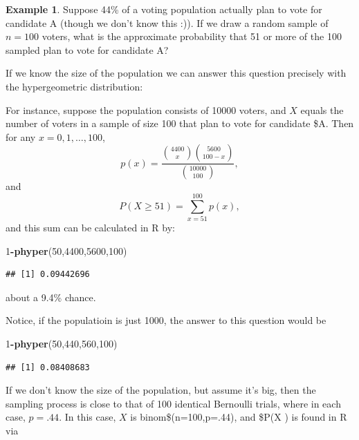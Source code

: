 \documentclass[
]{book}
\newenvironment{Shaded}{\begin{snugshade}}{\end{snugshade}}
\newcommand{\DecValTok}[1]{\textcolor[rgb]{0.00,0.00,0.81}{#1}}
\newcommand{\FunctionTok}[1]{\textcolor[rgb]{0.13,0.29,0.53}{\textbf{#1}}}
\newcommand{\NormalTok}[1]{#1}
\newcommand{\SpecialCharTok}[1]{\textcolor[rgb]{0.81,0.36,0.00}{\textbf{#1}}}
\theoremstyle{definition}
\theoremstyle{definition}
\newtheorem{example}{Example}[chapter]
\theoremstyle{definition}
\theoremstyle{definition}
\theoremstyle{remark}
\begin{document}
\begin{example}

Suppose 44\% of a voting population actually plan to vote for candidate A (though we don't know this :)). If we draw a random sample of \(n = 100\) voters, what is the approximate probability that 51 or more of the 100 sampled plan to vote for candidate A?

If we know the size of the population we can answer this question precisely with the hypergeometric distribution:

For instance, suppose the population consists of 10000 voters, and \(X\) equals the number of voters in a sample of size 100 that plan to vote for candidate \$A. Then for any \(x = 0, 1, \ldots, 100\),
\[p(x) = \frac{\binom{4400}{x}\binom{5600}{100-x}}{\binom{10000}{100}},\]
and \[P(X \geq 51) = \sum_{x = 51}^100 p(x),\]
and this sum can be calculated in R by:

\begin{Shaded}
\begin{Highlighting}[]
\DecValTok{1}\SpecialCharTok{{-}}\FunctionTok{phyper}\NormalTok{(}\DecValTok{50}\NormalTok{,}\DecValTok{4400}\NormalTok{,}\DecValTok{5600}\NormalTok{,}\DecValTok{100}\NormalTok{)}
\end{Highlighting}
\end{Shaded}

\begin{verbatim}
## [1] 0.09442696
\end{verbatim}

about a 9.4\% chance.

Notice, if the populatioin is just 1000, the answer to this question would be

\begin{Shaded}
\begin{Highlighting}[]
\DecValTok{1}\SpecialCharTok{{-}}\FunctionTok{phyper}\NormalTok{(}\DecValTok{50}\NormalTok{,}\DecValTok{440}\NormalTok{,}\DecValTok{560}\NormalTok{,}\DecValTok{100}\NormalTok{)}
\end{Highlighting}
\end{Shaded}

\begin{verbatim}
## [1] 0.08408683
\end{verbatim}

If we don't know the size of the population, but assume it's big, then the sampling process is close to that of 100 identical Bernoulli trials, where in each case, \(p = .44\). In this case, \(X\) is binom\$(n=100,p=.44), and \$P(X ) is found in R via


\end{example}
\end{document}
